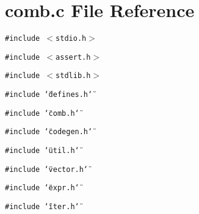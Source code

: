 \section{comb.c File Reference}
\label{comb_8c}
{\tt \#include $<$stdio.h$>$}\par
{\tt \#include $<$assert.h$>$}\par
{\tt \#include $<$stdlib.h$>$}\par
{\tt \#include \char`\"{}defines.h\char`\"{}}\par
{\tt \#include \char`\"{}comb.h\char`\"{}}\par
{\tt \#include \char`\"{}codegen.h\char`\"{}}\par
{\tt \#include \char`\"{}util.h\char`\"{}}\par
{\tt \#include \char`\"{}vector.h\char`\"{}}\par
{\tt \#include \char`\"{}expr.h\char`\"{}}\par
{\tt \#include \char`\"{}iter.h\char`\"{}}\par
